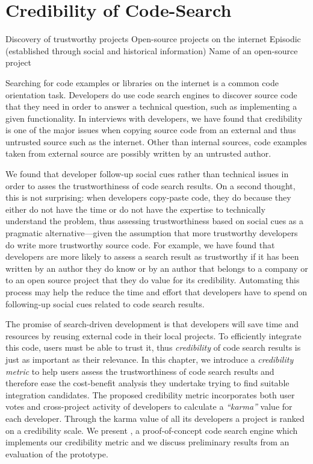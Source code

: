 
\chapter{Credibility of Code-Search}
\label{the chapter on codesearch}

\infobox
	{Discovery of trustworthy projects}
	{Open-source projects on the internet}
	{Episodic (established through social and historical information)}
	{Name of an open-source project}

Searching for code examples or libraries on the internet is a common code orientation task. Developers do use code search engines to discover source code that they need in order to answer a technical question, such as implementing a given functionality. In interviews with developers, we have found that credibility is one of the major issues when copying source code from an external and thus untrusted source such as the internet. Other than internal sources, code examples taken from external source are possibly written by an untrusted author.

We found that developer follow-up social cues rather than technical issues in order to asses the trustworthiness of code search results. On a second thought, this is not surprising: when developers copy-paste code, they do because they either do not have the time or do not have the expertise to technically understand the problem, thus assessing trustworthiness based on social cues as a pragmatic alternative---given the assumption that more trustworthy developers do write more trustworthy source code. For example, we have found that developers are more likely to assess a search result as trustworthy if it has been written by an author they do know or by an author that belongs to a company or to an open source project that they do value for its credibility. Automating this process may help the reduce the time and effort that developers have to spend on following-up social cues related to code search results.

\asteriskasteriskasterisk

The promise of search-driven development is that developers will save time and resources by reusing external code in their local projects. To efficiently integrate this code, users must be able to trust it, thus \emph{credibility} of code search results is just as important as their relevance. 
%
In this chapter, we introduce a \emph{credibility metric} to help users assess the trustworthiness of code search results and therefore ease the cost-benefit analysis they undertake trying to find suitable integration candidates. The proposed credibility metric incorporates both user votes and cross-project activity of developers to calculate a \emph{``karma''} value for each developer. Through the karma value of all its developers a project is ranked on a credibility scale.
%
We present \Jbd, a proof-of-concept code search engine which implements our credibility metric and we discuss preliminary results from an evaluation of the prototype.


